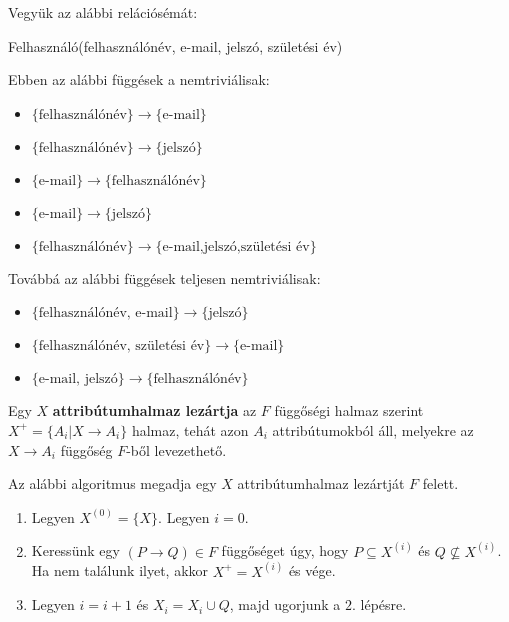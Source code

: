 \begin{pld}
Vegyük az alábbi relációsémát:
\begin{center}
    Felhasználó(felhasználónév, e-mail, jelszó, születési év)
\end{center}
Ebben az alábbi függések a nemtriviálisak:
\begin{itemize}
    \item $\{\text{felhasználónév}\}\longrightarrow \{\text{e-mail}\}$
    \item $\{\text{felhasználónév}\}\longrightarrow \{\text{jelszó}\}$
    \item $\{\text{e-mail}\}\longrightarrow \{\text{felhasználónév}\}$
    \item $\{\text{e-mail}\}\longrightarrow \{\text{jelszó}\}$
    \item $\{\text{felhasználónév}\}\longrightarrow \{\text{e-mail,jelszó,születési év}\}$
\end{itemize}
Továbbá az alábbi függések teljesen nemtriviálisak:

\begin{itemize}
    \item $\{\text{felhasználónév, e-mail}\} \longrightarrow \{\text{jelszó}\}$
    \item $\{\text{felhasználónév, születési év}\} \longrightarrow \{\text{e-mail}\}$
    \item $\{\text{e-mail, jelszó}\} \longrightarrow \{\text{felhasználónév}\}$
\end{itemize}

\end{pld}

\begin{defi}
Egy $X$ \textbf{attribútumhalmaz lezártja} az $F$ függőségi halmaz szerint $X^+ = \{ A_i | X \longrightarrow A_i\}$ halmaz, tehát azon $A_i$ attribútumokból áll, melyekre az $X \longrightarrow A_i$ függőség $F$-ből levezethető.
\end{defi}

\begin{tet} \label{closedAttribute}
Az alábbi algoritmus megadja egy $X$ attribútumhalmaz lezártját $F$ felett.
\begin{enumerate}
    \item Legyen $X^{(0)} = \{X\}$. Legyen $i = 0$.
    \item Keressünk egy $(P \longrightarrow Q) \in F$ függőséget úgy, hogy $P \subseteq X^{(i)}$ és $Q \not\subseteq X^{(i)}$. Ha nem találunk ilyet, akkor $X^+ = X^{(i)}$ és vége.
    \item Legyen $i = i + 1$ és $X_i = X_i \cup Q$, majd ugorjunk a $2.$ lépésre.
\end{enumerate}
\end{tet}

